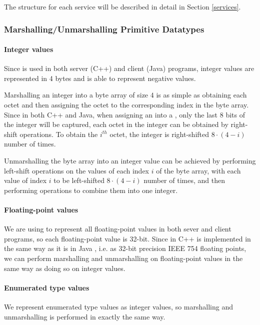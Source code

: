 \documentclass[12pt]{article}
\begin{document}
The structure for each service will be described in detail in Section \ref{services}.

\subsubsection{Marshalling/Unmarshalling Primitive Datatypes}

\paragraph{Integer values}
Since  is used in both server (C++) and client (Java) programs, integer values are represented in 4 bytes and is able to represent negative values.

Marshalling an integer into a byte array of size $4$ is as simple as obtaining each octet and then assigning the octet to the corresponding index in the byte array. Since in both C++ and Java, when assigning an  into a , only the last 8 bits of the integer will be captured, each octet in the integer can be obtained by right-shift operations. To obtain the $i^{th}$ octet, the integer is right-shifted $8\cdot(4-i)$ number of times.

Unmarshalling the byte array into an integer value can be achieved by performing left-shift operations on the values of each index $i$ of the byte array, with each value of index $i$ to be left-shifted $8\cdot(4-i)$ number of times, and then performing  operations to combine them into one integer.

\paragraph{Floating-point values}
We are using  to represent all floating-point values in both sever and client programs, so each floating-point value is 32-bit. Since  in C++ is implemented in the same way as it is in Java , i.e. as 32-bit precision IEEE 754 floating points, we can perform marshalling and unmarshalling on floating-point values in the same way as doing so on integer values.

\paragraph{Enumerated type values}
We represent enumerated type values as integer values, so marshalling and unmarshalling is performed in exactly the same way.
\end{document}
